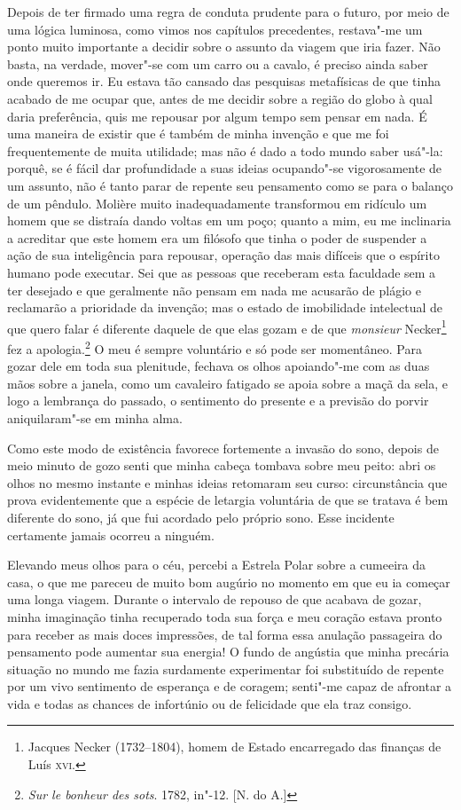  Depois de ter firmado uma regra de conduta prudente para o futuro, por
meio de uma lógica luminosa, como vimos nos capítulos precedentes,
restava"-me um ponto muito importante a decidir sobre o assunto da
viagem que iria fazer. Não basta, na verdade, mover"-se com um carro ou
a cavalo, é preciso ainda saber onde queremos ir. Eu estava tão cansado
das pesquisas metafísicas de que tinha acabado de me ocupar que, antes
de me decidir sobre a região do globo à qual daria preferência, quis me
repousar por algum tempo sem pensar em nada. É uma maneira de existir
que é também de minha invenção e que me foi frequentemente de muita
utilidade; mas não é dado a todo mundo saber usá"-la: porquê, se é fácil
dar profundidade a suas ideias ocupando"-se vigorosamente de um assunto,
não é tanto parar de repente seu pensamento como se para o balanço de
um pêndulo. Molière muito inadequadamente transformou em ridículo um
homem que se distraía dando voltas em um poço; quanto a mim, eu me
inclinaria a acreditar que este homem era um filósofo que tinha o poder
de suspender a ação de sua inteligência para repousar, operação das
mais difíceis que o espírito humano pode executar. Sei que as pessoas
que receberam esta faculdade sem a ter desejado e que geralmente não
pensam em nada me acusarão de plágio e reclamarão a prioridade da
invenção; mas o estado de imobilidade intelectual de que quero falar é
diferente daquele de que elas gozam e de que \textit{monsieur}
Necker\footnote{ Jacques Necker (1732--1804), homem de Estado
encarregado das finanças de Luís \textsc{xvi}.} fez a apologia.\footnote{
\textit{Sur le bonheur des sots}. 1782, in"-12. [N. do A.]}  O meu é sempre
voluntário e só pode ser momentâneo. Para gozar dele em toda sua
plenitude, fechava os olhos apoiando"-me com as duas mãos sobre a
janela, como um cavaleiro fatigado se apoia sobre a maçã da sela, e
logo a lembrança do passado, o sentimento do presente e a previsão do
porvir aniquilaram"-se em minha alma.

 Como este modo de existência favorece fortemente a invasão do sono,
depois de meio minuto de gozo senti que minha cabeça tombava sobre meu
peito: abri os olhos no mesmo instante e minhas ideias retomaram seu
curso: circunstância que prova evidentemente que a espécie de letargia
voluntária de que se tratava é bem diferente do sono, já que fui
acordado pelo próprio sono. Esse incidente certamente jamais ocorreu a ninguém.

 Elevando meus olhos para o céu, percebi a Estrela Polar sobre a
cumeeira da casa, o que me pareceu de muito bom augúrio no momento em
que eu ia começar uma longa viagem. Durante o intervalo de repouso de
que acabava de gozar, minha imaginação tinha recuperado toda sua força
e meu coração estava pronto para receber as mais doces impressões, de
tal forma essa anulação passageira do pensamento pode aumentar sua
energia! O fundo de angústia que minha precária situação no mundo me
fazia surdamente experimentar foi substituído de repente por um vivo
sentimento de esperança e de coragem; senti"-me capaz de afrontar a vida
e todas as chances de infortúnio ou de felicidade que ela traz consigo.

